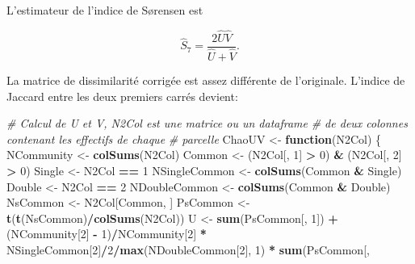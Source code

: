 \documentclass[
  11pt,
  french,
  a4paper,
  extrafontsizes,onecolumn,openright
  ]{memoir}
\newenvironment{Shaded}{\begin{snugshade}}{\end{snugshade}}
\newcommand{\CommentTok}[1]{\textcolor[rgb]{0.56,0.35,0.01}{\textit{#1}}}
\newcommand{\ControlFlowTok}[1]{\textcolor[rgb]{0.13,0.29,0.53}{\textbf{#1}}}
\newcommand{\DecValTok}[1]{\textcolor[rgb]{0.00,0.00,0.81}{#1}}
\newcommand{\FunctionTok}[1]{\textcolor[rgb]{0.13,0.29,0.53}{\textbf{#1}}}
\newcommand{\NormalTok}[1]{#1}
\newcommand{\OtherTok}[1]{\textcolor[rgb]{0.56,0.35,0.01}{#1}}
\newcommand{\SpecialCharTok}[1]{\textcolor[rgb]{0.81,0.36,0.00}{\textbf{#1}}}
\begin{document}
L'estimateur de l'indice de Sørensen est

\begin{equation}
  \label{eq:EstS7}
  \hat{S}_7 = \frac{2\hat{U}\hat{V}}{\hat{U}+\hat{V}}.
\end{equation}

La matrice de dissimilarité corrigée est assez différente de l'originale. L'indice de Jaccard entre les deux premiers carrés devient:

\scriptsize

\begin{Shaded}
\begin{Highlighting}[]
\CommentTok{\# Calcul de U et V, N2Col est une matrice ou un dataframe}
\CommentTok{\# de deux colonnes contenant les effectifs de chaque}
\CommentTok{\# parcelle}
\NormalTok{ChaoUV }\OtherTok{\textless{}{-}} \ControlFlowTok{function}\NormalTok{(N2Col) \{}
\NormalTok{    NCommunity }\OtherTok{\textless{}{-}} \FunctionTok{colSums}\NormalTok{(N2Col)}
\NormalTok{    Common }\OtherTok{\textless{}{-}}\NormalTok{ (N2Col[, }\DecValTok{1}\NormalTok{] }\SpecialCharTok{\textgreater{}} \DecValTok{0}\NormalTok{) }\SpecialCharTok{\&}\NormalTok{ (N2Col[, }\DecValTok{2}\NormalTok{] }\SpecialCharTok{\textgreater{}} \DecValTok{0}\NormalTok{)}
\NormalTok{    Single }\OtherTok{\textless{}{-}}\NormalTok{ N2Col }\SpecialCharTok{==} \DecValTok{1}
\NormalTok{    NSingleCommon }\OtherTok{\textless{}{-}} \FunctionTok{colSums}\NormalTok{(Common }\SpecialCharTok{\&}\NormalTok{ Single)}
\NormalTok{    Double }\OtherTok{\textless{}{-}}\NormalTok{ N2Col }\SpecialCharTok{==} \DecValTok{2}
\NormalTok{    NDoubleCommon }\OtherTok{\textless{}{-}} \FunctionTok{colSums}\NormalTok{(Common }\SpecialCharTok{\&}\NormalTok{ Double)}
\NormalTok{    NsCommon }\OtherTok{\textless{}{-}}\NormalTok{ N2Col[Common, ]}
\NormalTok{    PsCommon }\OtherTok{\textless{}{-}} \FunctionTok{t}\NormalTok{(}\FunctionTok{t}\NormalTok{(NsCommon)}\SpecialCharTok{/}\FunctionTok{colSums}\NormalTok{(N2Col))}
\NormalTok{    U }\OtherTok{\textless{}{-}} \FunctionTok{sum}\NormalTok{(PsCommon[, }\DecValTok{1}\NormalTok{]) }\SpecialCharTok{+}\NormalTok{ (NCommunity[}\DecValTok{2}\NormalTok{] }\SpecialCharTok{{-}} \DecValTok{1}\NormalTok{)}\SpecialCharTok{/}\NormalTok{NCommunity[}\DecValTok{2}\NormalTok{] }\SpecialCharTok{*}
\NormalTok{        NSingleCommon[}\DecValTok{2}\NormalTok{]}\SpecialCharTok{/}\DecValTok{2}\SpecialCharTok{/}\FunctionTok{max}\NormalTok{(NDoubleCommon[}\DecValTok{2}\NormalTok{], }\DecValTok{1}\NormalTok{) }\SpecialCharTok{*} \FunctionTok{sum}\NormalTok{(PsCommon[,}

\end{Highlighting}
\end{Shaded}
\end{document}
